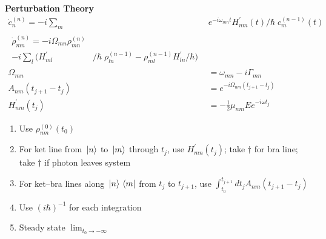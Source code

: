 \documentclass[12pt]{article}
\begin{document}
\begin{multicols}{2}
  \textbf{Perturbation Theory}
  \begin{align}
    \dot{c}_{n}^{(n)} = -i \sum_m &e^{-i\omega_{mn} t} H_{nm}^{\prime}(t)/\hbar \; c_{m}^{(n - 1)}(t)\\ %
    \begin{split}
      \dot{\rho}_{mn}^{(n)} = -i \Omega_{mn} \rho_{mn}^{(n)}&\\
      -i \sum_{l} (H^{\prime}_{ml}&/\hbar \; \rho_{ln}^{(n - 1)} - \rho_{ml}^{(n - 1)} H^{\prime}_{ln}/\hbar) %
    \end{split}\\
    \Omega_{mn} &= \omega_{mn} - i\Gamma_{mn}\\
    A_{nm}(t_{j + 1} - t_j) &= e^{-i\Omega_{nm}(t_{j+1} - t_j)}\\
    H^{\prime}_{nm}(t_j) &= -\frac{1}{2}\mu_{nm}Ee^{-i\omega t_j}
  \end{align}

  \begin{enumerate}
  \item Use $\rho^{(0)}_{nm}(t_0)$
  \item For ket line from $\ket*{n}$ to $\ket*{m}$ through $t_j$, use $H_{mn}^{\prime}(t_j)$; take $\dagger$ for bra line;
    take $\dagger$ if photon leaves system
  \item For ket--bra lines along $\ket*{n}\bra*{m}$ from $t_j$ to $t_{j + 1}$, use $\int_{t_0}^{t_{j+1}} dt_j A_{nm}(t_{j + 1} - t_j)$
  \item Use $(i\hbar)^{-1}$ for each integration
  \item Steady state $\lim_{t_0 \rightarrow -\infty}$
  \end{enumerate}

\end{multicols}
\end{document}
